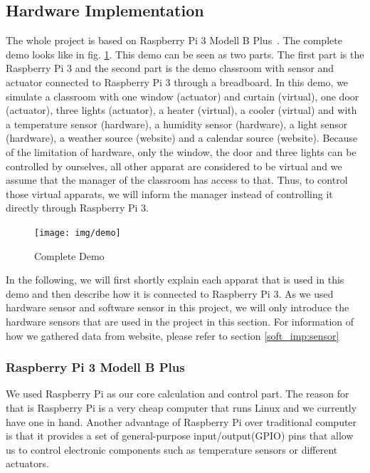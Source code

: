 \documentclass[runningheads]{llncs}
\begin{document}
\subsection{Hardware Implementation}
\label{imp:hard_imp}
The whole project is based on Raspberry Pi 3 Modell B Plus~\cite{pi3}. The complete demo looks like in fig. \ref{pic:demo}. This demo can be seen as two parts. The first part is the Raspberry Pi 3 and the second part is the demo classroom with sensor and actuator connected to Raspberry Pi 3 through a breadboard. In this demo, we simulate a classroom with one window (actuator) and curtain (virtual), one door (actuator), three lights (actuator), a heater (virtual), a cooler (virtual) and with a temperature sensor (hardware), a humidity sensor (hardware), a light sensor (hardware), a weather source (website) and a calendar source (website). Because of the limitation of hardware, only the window, the door and three lights can be controlled by ourselves, all other apparat are considered to be virtual and we assume that the manager of the classroom has access to that. Thus, to control those virtual apparats, we will inform the manager instead of controlling it directly through Raspberry Pi 3.

\begin{figure}
\centering
\texttt{[image: img/demo]}
\caption{Complete Demo} 
\label{pic:demo}
\end{figure}

In the following, we will first shortly explain each apparat that is used in this demo and then describe how it is connected to Raspberry Pi 3. As we used hardware sensor and software sensor in this project, we will only introduce the hardware sensors that are used in the project in this section. For information of how we gathered data from website, please refer to section \ref{soft_imp:sensor}

\subsubsection{Raspberry Pi 3 Modell B Plus}\hfill
\label{hard_imp:pi3}
\newline
We used Raspberry Pi as our core calculation and control part. The reason for that is Raspberry Pi is a very cheap computer that runs Linux and we currently have one in hand. Another advantage of Raspberry Pi over traditional computer is that it provides a set of general-purpose input/output(GPIO) pins that allow us to control electronic components such as temperature sensors or different actuators.
\end{document}
